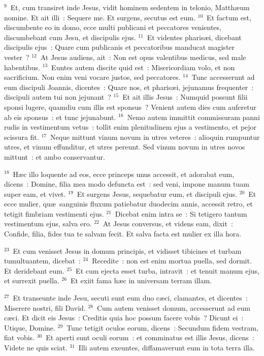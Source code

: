 ${}^{9}$~Et, cum transiret inde Jesus, vidit hominem sedentem in telonio, Matth\ae um nomine. Et ait illi~: Sequere me. Et surgens, secutus est eum.
${}^{10}$~Et factum est, discumbente eo in domo, ecce multi publicani et peccatores venientes, discumbebant cum Jesu, et discipulis ejus.
${}^{11}$~Et videntes pharis\ae i, dicebant discipulis ejus~: Quare cum publicanis et peccatoribus manducat magister vester~?
${}^{12}$~At Jesus audiens, ait~: Non est opus valentibus medicus, sed male habentibus.
${}^{13}$~Euntes autem discite quid est~: Misericordiam volo, et non sacrificium. Non enim veni vocare justos, sed peccatores.
${}^{14}$~Tunc accesserunt ad eum discipuli Joannis, dicentes~: Quare nos, et pharis\ae i, jejunamus frequenter~: discipuli autem tui non jejunant~?
${}^{15}$~Et ait illis Jesus~: Numquid possunt filii sponsi lugere, quamdiu cum illis est sponsus~? Venient autem dies cum auferetur ab eis sponsus~: et tunc jejunabunt.
${}^{16}$~Nemo autem immittit commissuram panni rudis in vestimentum vetus~: tollit enim plenitudinem ejus a vestimento, et pejor scissura fit.
${}^{17}$~Neque mittunt vinum novum in utres veteres~: alioquin rumpuntur utres, et vinum effunditur, et utres pereunt. Sed vinum novum in utres novos mittunt~: et ambo conservantur.


${}^{18}$~H\ae c illo loquente ad eos, ecce princeps unus accessit, et adorabat eum, dicens~: Domine, filia mea modo defuncta est~: sed veni, impone manum tuam super eam, et vivet.
${}^{19}$~Et surgens Jesus, sequebatur eum, et discipuli ejus.
${}^{20}$~Et ecce mulier, qu\ae\ sanguinis fluxum patiebatur duodecim annis, accessit retro, et tetigit fimbriam vestimenti ejus.
${}^{21}$~Dicebat enim intra se~: Si tetigero tantum vestimentum ejus, salva ero.
${}^{22}$~At Jesus conversus, et videns eam, dixit~: Confide, filia, fides tua te salvam fecit. Et salva facta est mulier ex illa hora.


${}^{23}$~Et cum venisset Jesus in domum principis, et vidisset tibicines et turbam tumultuantem, dicebat~:
${}^{24}$~Recedite~: non est enim mortua puella, sed dormit. Et deridebant eum.
${}^{25}$~Et cum ejecta esset turba, intravit~: et tenuit manum ejus, et surrexit puella.
${}^{26}$~Et exiit fama h\ae c in universam terram illam.


${}^{27}$~Et transeunte inde Jesu, secuti sunt eum duo c\ae ci, clamantes, et dicentes~: Miserere nostri, fili David.
${}^{28}$~Cum autem venisset domum, accesserunt ad eum c\ae ci. Et dicit eis Jesus~: Creditis quia hoc possum facere vobis~? Dicunt ei~: Utique, Domine.
${}^{29}$~Tunc tetigit oculos eorum, dicens~: Secundum fidem vestram, fiat vobis.
${}^{30}$~Et aperti sunt oculi eorum~: et comminatus est illis Jesus, dicens~: Videte ne quis sciat.
${}^{31}$~Illi autem exeuntes, diffamaverunt eum in tota terra illa.


